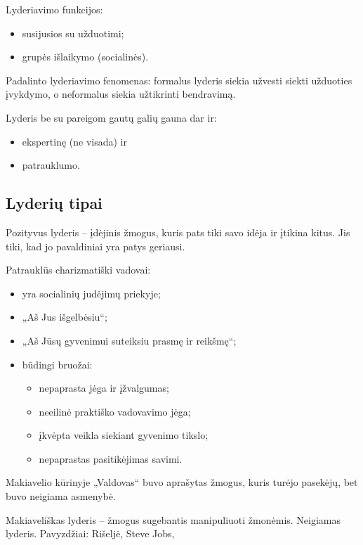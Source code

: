 Lyderiavimo funkcijos:
\begin{itemize}
  \item susijusios su užduotimi;
  \item grupės išlaikymo (socialinės).
\end{itemize}

Padalinto lyderiavimo fenomenas: formalus lyderis siekia užvesti siekti
užduoties įvykdymo, o neformalus siekia užtikrinti bendravimą.

Lyderis be su pareigom gautų galių gauna dar ir:
\begin{itemize}
  \item ekspertinę (ne visada) ir
  \item patrauklumo.
\end{itemize}

\subsection{Lyderių tipai}

Pozityvus lyderis – įdėjinis žmogus, kuris pats tiki savo idėja ir įtikina
kitus. Jis tiki, kad jo pavaldiniai yra patys geriausi.

Patrauklūs charizmatiški vadovai:
\begin{itemize}
  \item yra socialinių judėjimų priekyje;
  \item „Aš Jus išgelbėsiu“;
  \item „Aš Jūsų gyvenimui suteiksiu prasmę ir reikšmę“;
  \item būdingi bruožai:
    \begin{itemize}
      \item nepaprasta jėga ir įžvalgumas;
      \item neeilinė praktiško vadovavimo jėga;
      \item įkvėpta veikla siekiant gyvenimo tikslo;
      \item nepaprastas pasitikėjimas savimi.
    \end{itemize}
\end{itemize}

Makiavelio kūrinyje „Valdovas“ buvo aprašytas žmogus, kuris turėjo
pasekėjų, bet buvo neigiama asmenybė.

Makiaveliškas lyderis – žmogus sugebantis manipuliuoti žmonėmis.
Neigiamas lyderis. Pavyzdžiai: Rišeljė, Steve Jobs, 


